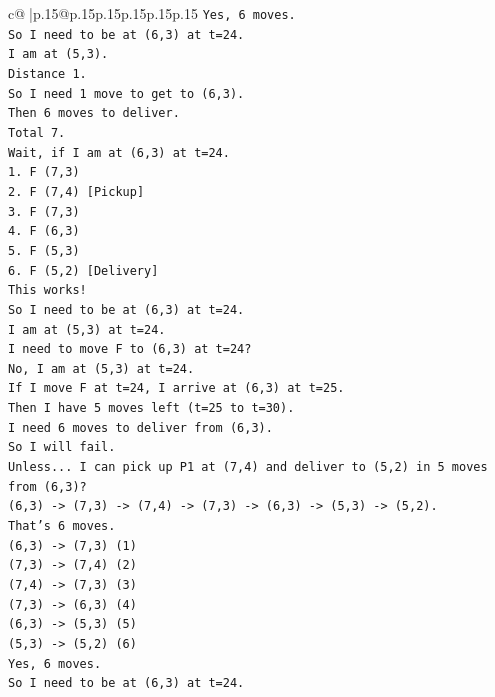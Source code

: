 \documentclass{article}
\begin{document}
{\begin{supertabular}{c@{$\;$}|p{.15\linewidth}@{}p{.15\linewidth}p{.15\linewidth}p{.15\linewidth}p{.15\linewidth}p{.15\linewidth}}
{{{\texttt{Yes, 6 moves.} \\
\texttt{So I need to be at (6,3) at t=24.} \\
\texttt{I am at (5,3).} \\
\texttt{Distance 1.} \\
\texttt{So I need 1 move to get to (6,3).} \\
\texttt{Then 6 moves to deliver.} \\
\texttt{Total 7.} \\
\texttt{Wait, if I am at (6,3) at t=24.} \\
\texttt{1. F (7,3)} \\
\texttt{2. F (7,4) {[}Pickup{]}} \\
\texttt{3. F (7,3)} \\
\texttt{4. F (6,3)} \\
\texttt{5. F (5,3)} \\
\texttt{6. F (5,2) {[}Delivery{]}} \\
\texttt{This works!} \\
\texttt{So I need to be at (6,3) at t=24.} \\
\texttt{I am at (5,3) at t=24.} \\
\texttt{I need to move F to (6,3) at t=24?} \\
\texttt{No, I am at (5,3) at t=24.} \\
\texttt{If I move F at t=24, I arrive at (6,3) at t=25.} \\
\texttt{Then I have 5 moves left (t=25 to t=30).} \\
\texttt{I need 6 moves to deliver from (6,3).} \\
\texttt{So I will fail.} \\
\texttt{Unless... I can pick up P1 at (7,4) and deliver to (5,2) in 5 moves from (6,3)?} \\
\texttt{(6,3) {-}> (7,3) {-}> (7,4) {-}> (7,3) {-}> (6,3) {-}> (5,3) {-}> (5,2).} \\
\texttt{That's 6 moves.} \\
\texttt{(6,3) {-}> (7,3) (1)} \\
\texttt{(7,3) {-}> (7,4) (2)} \\
\texttt{(7,4) {-}> (7,3) (3)} \\
\texttt{(7,3) {-}> (6,3) (4)} \\
\texttt{(6,3) {-}> (5,3) (5)} \\
\texttt{(5,3) {-}> (5,2) (6)} \\
\texttt{Yes, 6 moves.} \\
\texttt{So I need to be at (6,3) at t=24.} \\
}}}
\end{supertabular}}
\end{document}
